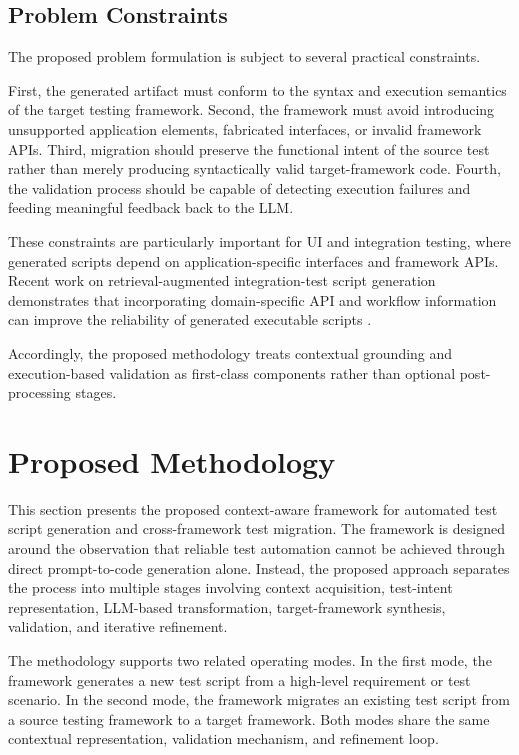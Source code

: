 \documentclass[pdflatex,sn-mathphys-num]{sn-jnl}
\begin{document}
\subsection{Problem Constraints}
\label{subsec:problem-constraints}

The proposed problem formulation is subject to several practical
constraints.

First, the generated artifact must conform to the syntax and execution
semantics of the target testing framework. Second, the framework must avoid
introducing unsupported application elements, fabricated interfaces, or
invalid framework APIs. Third, migration should preserve the functional
intent of the source test rather than merely producing syntactically valid
target-framework code. Fourth, the validation process should be capable of
detecting execution failures and feeding meaningful feedback back to the
LLM.

These constraints are particularly important for UI and integration testing,
where generated scripts depend on application-specific interfaces and
framework APIs. Recent work on retrieval-augmented integration-test script
generation demonstrates that incorporating domain-specific API and workflow
information can improve the reliability of generated executable scripts
\cite{ase2025ragtesting}.

Accordingly, the proposed methodology treats contextual grounding and
execution-based validation as first-class components rather than optional
post-processing stages.


\section{Proposed Methodology}
\label{sec:methodology}

This section presents the proposed context-aware framework for automated test
script generation and cross-framework test migration. The framework is
designed around the observation that reliable test automation cannot be
achieved through direct prompt-to-code generation alone. Instead, the
proposed approach separates the process into multiple stages involving
context acquisition, test-intent representation, LLM-based transformation,
target-framework synthesis, validation, and iterative refinement.

The methodology supports two related operating modes. In the first mode,
the framework generates a new test script from a high-level requirement or
test scenario. In the second mode, the framework migrates an existing test
script from a source testing framework to a target framework. Both modes
share the same contextual representation, validation mechanism, and
refinement loop.
\end{document}
